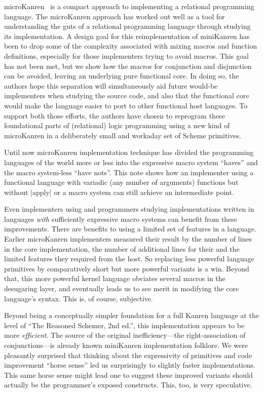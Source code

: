 \documentclass[sigplan,screen,draft,anonymous,review,natbib=false]{acmart}
\begin{document}
microKanren~\cite{hemann2013muKanren} is a compact approach to
implementing a relational programming language. The microKanren
approach has worked out well as a tool for understanding the guts of a
relational programming language through studying its implementation. A
design goal for this reimplementation of miniKanren has been to drop
some of the complexity associated with mixing macros and function
definitions, especially for those implementers trying to avoid macros.
This goal has not been met, but we show how the macros for conjunction
and disjunction can be avoided, leaving an underlying pure functional
core. In doing so, the authors hope this separation will
simultaneously aid future would-be implementers when studying the
source code, and also that the functional core would make the language
easier to port to other functional host languages. To support both
those efforts, the authors have chosen to reprogram these foundational
parts of (relational) logic programming using a new kind of
microKanren in a deliberately small and workaday set of Scheme
primitives.

Until now microKanren implementation technique has divided the
programming languages of the world more or less into the expressive
macro system \enquote{haves} and the macro system-less \enquote{have
  nots}. This note shows how an implementer using a functional
language with variadic (any number of arguments) functions but without
\rackinline|apply| or a macro system can still achieve an intermediate
point.

Even implementers using and programmers studying implementations
written in languages \emph{with} sufficiently expressive macro systems
can benefit from these improvements. There are benefits to using a
limited set of features in a language. Earlier microKanren implementers
measured their result by the number of lines in the core
implementation, the number of additional lines for their and the
limited features they required from the host. So replacing less
powerful language primitives by comparatively short but more powerful
variants is a win. Beyond that, this more powerful kernel language
obviates several macros in the desugaring layer, and eventually
leads us to see merit in modifying the core
language's syntax. This is, of course, subjective.

Beyond being a conceptually simpler foundation for a full Kanren
language at the level of ``The Reasoned Schemer, 2nd ed.'', this
implementation appears to be more \emph{efficient}. The
source of the original inefficiency---the right-association of
conjunctions---is already known miniKanren implementation folklore. We
were pleasantly surprised that thinking about the expressivity of
primitives and code improvement \enquote{horse sense} led us surprisingly
to slightly faster implementations. This same horse sense might lead one
to suggest these improved variants should actually be the programmer's
exposed constructs. This, too, is very speculative.
\end{document}
